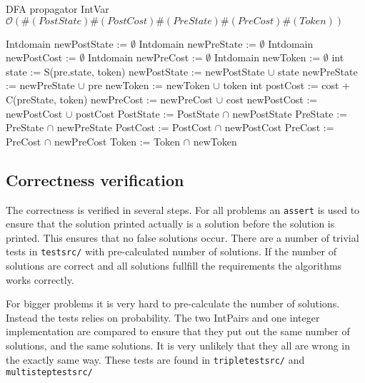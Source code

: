 \documentclass[a4paper,11pt]{article}
\begin{document}
\begin{algorithm}[H]
\caption{DFA propagator IntVar\newline $\mathcal{O}(\#(PostState)\#(PostCost)\#(PreState)\#(PreCost)\#(Token))$}
\begin{algorithmic}[1]
\State Intdomain newPostState := $\emptyset$
\State Intdomain newPreState := $\emptyset$
\State Intdomain newPostCost := $\emptyset$
\State Intdomain newPreCost := $\emptyset$
\State Intdomain newToken := $\emptyset$
		\State int state := S(pre.state, token)
			\State newPostState := newPostState $\cup$ state
			\State newPreState := newPreState $\cup$ pre
			\State newToken := newToken $\cup$ token 
				\State int postCost := cost + C(preState, token)
					\State newPreCost := newPreCost $\cup$ cost
					\State newPostCost := newPostCost $\cup$ postCost
				\EndIf
			\EndFor
		\EndIf
	\EndFor
\EndFor
\State PostState := PostState $\cap$ newPostState
\State PreState := PreState $\cap$ newPreState
\State PostCost := PostCost $\cap$ newPostCost
\State PreCost := PreCost $\cap$ newPreCost
\State Token := Token $\cap$ newToken
\EndProcedure
\end{algorithmic}
\end{algorithm}


\subsection{Correctness verification}
The correctness is verified in several steps. For all problems an \texttt{assert} is used to ensure that the solution printed actually is a solution before the solution is printed. This ensures that no false solutions occur. There are a number of trivial tests in \texttt{testsrc/} with pre-calculated number of solutions. If the number of solutions are correct and all solutions fullfill the requirements the algorithms works correctly.

For bigger problems it is very hard to pre-calculate the number of solutions. Instead the tests relies on probability. The two IntPairs and one integer implementation are compared to ensure that they put out the same number of solutions, and the same solutions. It is very unlikely that they all are wrong in the exactly same way. These tests are found in \texttt{tripletestsrc/} and \texttt{multisteptestsrc/}
\end{document}
